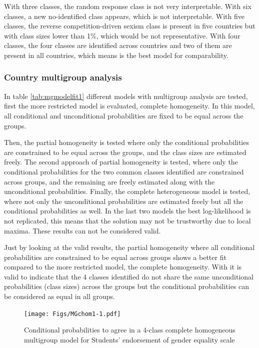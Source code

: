 \documentclass[12pt,a4paper,oneside]{reedthesis}
\begin{document}
With three classes, the random response class is not very interpretable. With six classes, a new no-identified class appears, which is not interpretable. With five classes, the reverse competition-driven sexism class is present in five countries but with class sizes lower than 1\%, which would be not representative. With four classes, the four classes are identified across countries and two of them are present in all countries, which means is the best model for comparability.

\newpage

\hypertarget{country-multigroup-analysis}{%
\subsubsection{Country multigroup analysis}\label{country-multigroup-analysis}}

In table \ref{tab:mgmodelfit1} different models with multigroup analysis are tested, first the more restricted model is evaluated, complete homogeneity. In this model, all conditional and unconditional probabilities are fixed to be equal across the groups.

Then, the partial homogeneity is tested where only the conditional probabilities are constrained to be equal across the groups, and the class sizes are estimated freely. The second approach of partial homogeneity is tested, where only the conditional probabilities for the two common classes identified are constrained across groups, and the remaining are freely estimated along with the unconditional probabilities. Finally, the complete heterogeneous model is tested, where not only the unconditional probabilities are estimated freely but all the conditional probabilities as well.
In the last two models the best log-likelihood is not replicated, this means that the solution may not be trustworthy due to local maxima. These results can not be considered valid.

Just by looking at the valid results, the partial homogeneity where all conditional probabilities are constrained to be equal across groups shows a better fit compared to the more restricted model, the complete homogeneity. With it is valid to indicate that the 4 classes identified do not share the same unconditional probabilities (class sizes) across the groups but the conditional probabilities can be considered as equal in all groups.
\begin{figure}
\centering
\texttt{[image: Figs/MGchom1-1.pdf]}
\caption{\label{fig:MGchom1}Conditional probabilities to agree in a 4-class complete homogeneous multigroup model for Students' endorsement of gender equality scale}
\end{figure}
\newpage
\end{document}
